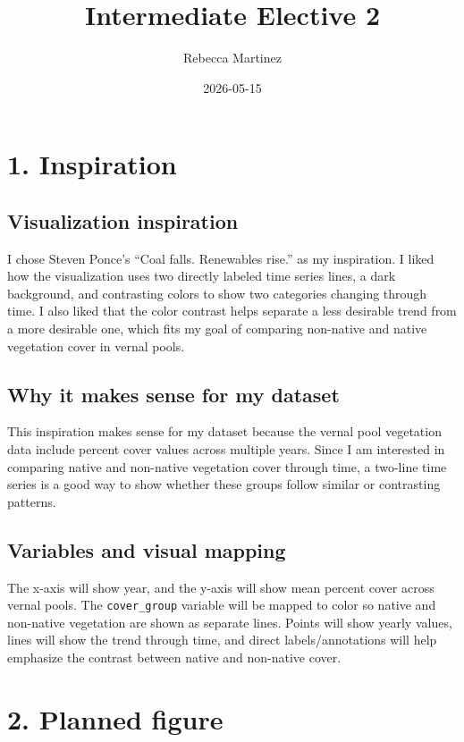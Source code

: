 \documentclass[
  letterpaper,
  DIV=11,
  numbers=noendperiod]{scrartcl}
\title{Intermediate Elective 2}
\author{Rebecca Martinez}
\date{2026-05-15}
\begin{document}
\maketitle


\section{1. Inspiration}\label{inspiration}

\subsection{Visualization inspiration}\label{visualization-inspiration}

I chose Steven Ponce's ``Coal falls. Renewables rise.'' as my
inspiration. I liked how the visualization uses two directly labeled
time series lines, a dark background, and contrasting colors to show two
categories changing through time. I also liked that the color contrast
helps separate a less desirable trend from a more desirable one, which
fits my goal of comparing non-native and native vegetation cover in
vernal pools.

\subsection{Why it makes sense for my
dataset}\label{why-it-makes-sense-for-my-dataset}

This inspiration makes sense for my dataset because the vernal pool
vegetation data include percent cover values across multiple years.
Since I am interested in comparing native and non-native vegetation
cover through time, a two-line time series is a good way to show whether
these groups follow similar or contrasting patterns.

\subsection{Variables and visual
mapping}\label{variables-and-visual-mapping}

The x-axis will show year, and the y-axis will show mean percent cover
across vernal pools. The \texttt{cover\_group} variable will be mapped
to color so native and non-native vegetation are shown as separate
lines. Points will show yearly values, lines will show the trend through
time, and direct labels/annotations will help emphasize the contrast
between native and non-native cover.

\section{2. Planned figure}\label{planned-figure}
\end{document}
